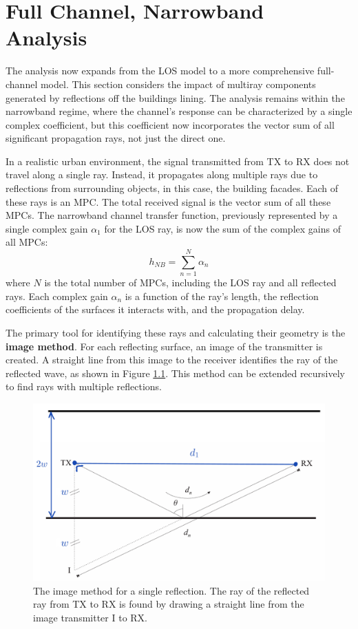 \chapter{Full Channel, Narrowband Analysis}
\label{chap:full_narrow}

The analysis now expands from the LOS model to a more comprehensive full-channel model. This section considers the impact of multiray components generated by reflections off the buildings lining. The analysis remains within the narrowband regime, where the channel's response can be characterized by a single complex coefficient, but this coefficient now incorporates the vector sum of all significant propagation rays, not just the direct one.


In a realistic urban environment, the signal transmitted from TX to RX does not travel along a single ray. Instead, it propagates along multiple rays due to reflections from surrounding objects, in this case, the building facades. Each of these rays is an MPC. The total received signal is the vector sum of all these MPCs. The narrowband channel transfer function, previously represented by a single complex gain $\alpha_1$ for the LOS ray, is now the sum of the complex gains of all MPCs:
\begin{equation}
	h_{NB} = \sum_{n=1}^{N} \alpha_n
\end{equation}
where $N$ is the total number of MPCs, including the LOS ray and all reflected rays. Each complex gain $\alpha_n$ is a function of the ray's length, the reflection coefficients of the surfaces it interacts with, and the propagation delay.

The primary tool for identifying these rays and calculating their geometry is the \textbf{image method}. For each reflecting surface, an image of the transmitter is created. A straight line from this image to the receiver identifies the ray of the reflected wave, as shown in Figure \ref{fig:image_method_single}. This method can be extended recursively to find rays with multiple reflections.

\begin{figure}[h!]
	\centering
	\includegraphics[width=0.7\linewidth]{content/4-images/image-method.png}
	\caption{The image method for a single reflection. The ray of the reflected ray from TX to RX is found by drawing a straight line from the image transmitter I to RX.}
	\label{fig:image_method_single}
\end{figure}


